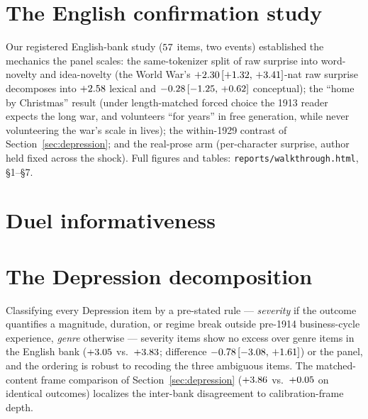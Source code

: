 \documentclass[11pt]{article}
\begin{document}
\section{The English confirmation study}\label{app:english}
Our registered English-bank study ($57$ items, two events) established the mechanics the panel scales:
the same-tokenizer split of raw surprise into word-novelty and idea-novelty (the World War's $+2.30\,[+1.32,\,+3.41]$-nat
raw surprise decomposes into $+2.58$ lexical and $-0.28\,[-1.25,\,+0.62]$ conceptual); the ``home by Christmas''
result (under length-matched forced choice the 1913 reader expects the long war, and volunteers ``for
years'' in free generation, while never volunteering the war's scale in lives); the within-1929 contrast of
Section~\ref{sec:depression}; and the real-prose arm (per-character surprise, author held fixed across the
shock). Full figures and tables: \texttt{reports/walkthrough.html}, \S1--\S7.

\section{Duel informativeness}\label{app:duels}
\begin{table}[h]\centering\small

\caption{All duel results by reader (share of pairs won by the truth, pooled over languages). Duels whose
neutral frame retains the event identity (most World-War and empire duels) calibrate away the loaded content
and carry little information by construction; the informative duels --- panic, pandemic, Depression, Nazi
seizure --- are those whose counterfactual redirects the catastrophe itself. Per-duel margins:
\texttt{reports/panel\_events.html}.}
\label{tab:tf}
\end{table}

\section{The Depression decomposition}\label{app:decomp}
Classifying every Depression item by a pre-stated rule --- \emph{severity} if the outcome quantifies a
magnitude, duration, or regime break outside pre-1914 business-cycle experience, \emph{genre} otherwise ---
severity items show no excess over genre items in the English bank ($+3.05$ vs.\ $+3.83$;
difference $-0.78\,[-3.08,\,+1.61]$) or the panel, and the ordering is robust to recoding the three ambiguous
items. The matched-content frame comparison of Section~\ref{sec:depression} ($+3.86$ vs.\
$+0.05$ on identical outcomes) localizes the inter-bank disagreement to calibration-frame depth.
\end{document}
